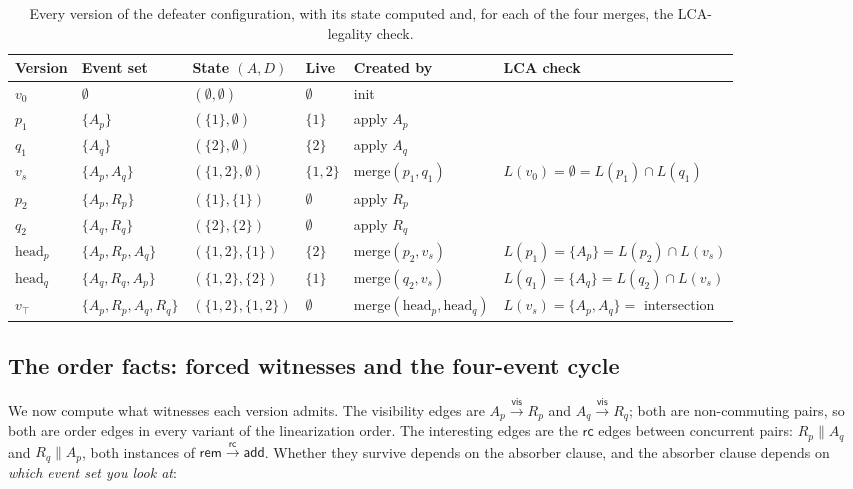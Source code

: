 \documentclass[11pt]{article}
\newcommand{\vis}{\xrightarrow{\mathsf{vis}}}
\newcommand{\rc}{\xrightarrow{\mathsf{rc}}}
\newcommand{\rcrel}{\mathsf{rc}}
\newcommand{\add}{\mathsf{add}}
\newcommand{\rem}{\mathsf{rem}}
\newcommand{\Ap}{A_p}
\newcommand{\Aq}{A_q}
\newcommand{\Rp}{R_p}
\newcommand{\Rq}{R_q}
\begin{document}
\begin{table}[t]
\centering
\footnotesize
\begin{tabular}{@{}llllll@{}}
\toprule
Version & Event set & State $(A,D)$ & Live & Created by & LCA check \\
\midrule
$v_0$ & $\emptyset$ & $(\emptyset,\emptyset)$ & $\emptyset$ & init &
  \\
$p_1$ & $\{\Ap\}$ & $(\{1\},\emptyset)$ & $\{1\}$ & apply $\Ap$ & \\
$q_1$ & $\{\Aq\}$ & $(\{2\},\emptyset)$ & $\{2\}$ & apply $\Aq$ & \\
$v_s$ & $\{\Ap,\Aq\}$ & $(\{1,2\},\emptyset)$ & $\{1,2\}$ &
  merge$(p_1,q_1)$ & $L(v_0)=\emptyset=L(p_1)\cap L(q_1)$ \\
$p_2$ & $\{\Ap,\Rp\}$ & $(\{1\},\{1\})$ & $\emptyset$ & apply $\Rp$ &
  \\
$q_2$ & $\{\Aq,\Rq\}$ & $(\{2\},\{2\})$ & $\emptyset$ & apply $\Rq$ &
  \\
$\mathrm{head}_p$ & $\{\Ap,\Rp,\Aq\}$ & $(\{1,2\},\{1\})$ & $\{2\}$ &
  merge$(p_2,v_s)$ & $L(p_1)=\{\Ap\}=L(p_2)\cap L(v_s)$ \\
$\mathrm{head}_q$ & $\{\Aq,\Rq,\Ap\}$ & $(\{1,2\},\{2\})$ & $\{1\}$ &
  merge$(q_2,v_s)$ & $L(q_1)=\{\Aq\}=L(q_2)\cap L(v_s)$ \\
$v_\top$ & $\{\Ap,\Rp,\Aq,\Rq\}$ & $(\{1,2\},\{1,2\})$ & $\emptyset$ &
  merge$(\mathrm{head}_p,\mathrm{head}_q)$ &
  $L(v_s)=\{\Ap,\Aq\}=$ intersection \\
\bottomrule
\end{tabular}
\caption{Every version of the defeater configuration, with its state
computed and, for each of the four merges, the LCA-legality check.}
\label{tab:versions}
\end{table}

\subsection{The order facts: forced witnesses and the four-event cycle}
\label{sec:orderfacts}

We now compute what witnesses each version admits. The visibility
edges are $\Ap \vis \Rp$ and $\Aq \vis \Rq$; both are non-commuting
pairs, so both are order edges in every variant of the linearization
order. The interesting edges are the $\rcrel$ edges between concurrent
pairs: $\Rp \parallel \Aq$ and $\Rq \parallel \Ap$, both instances of
$\rem \rc \add$. Whether they survive depends on the absorber clause,
and the absorber clause depends on \emph{which event set you look at}:
\end{document}

